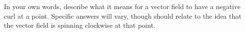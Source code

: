 {In your own words, describe what it means for a vector field to have a negative curl at a point.
}
{Specific answers will vary, though should relate to the idea that the vector field is spinning clockwise at that point.
}
